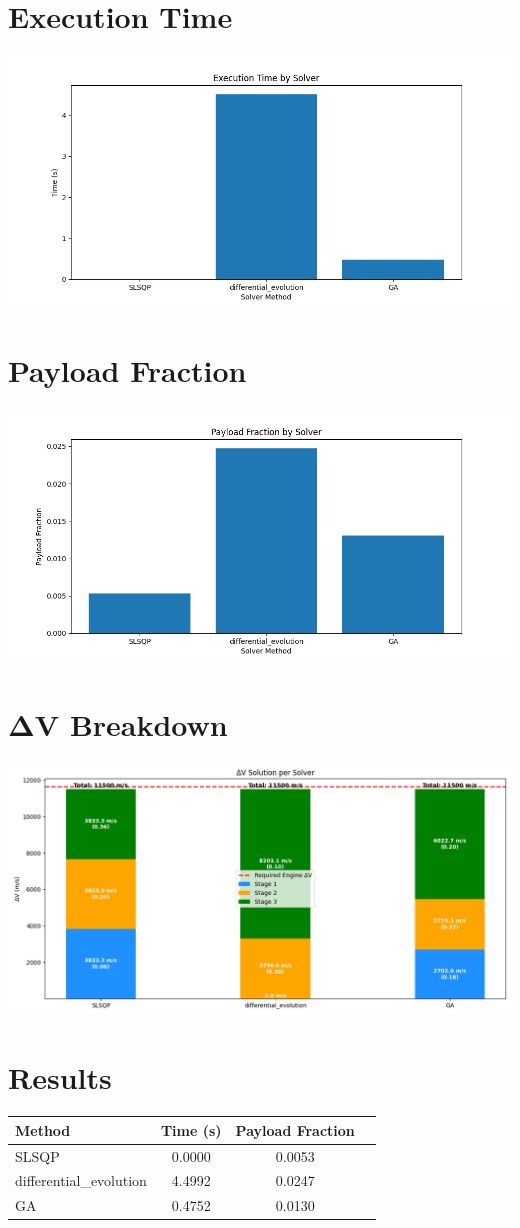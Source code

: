 \documentclass{article}
\begin{document}
\section{Execution Time}
\includegraphics[width=\textwidth]{execution_time.png}

\section{Payload Fraction}
\includegraphics[width=\textwidth]{payload_fraction.png}
                
\section{ΔV Breakdown}
\includegraphics[width=\textwidth]{dv_breakdown.png}

\section{Results}
\begin{tabular}{lccc}
\hline
Method & Time (s) & Payload Fraction \\
\hline
SLSQP & 0.0000 & 0.0053 \\
differential_evolution & 4.4992 & 0.0247 \\
GA & 0.4752 & 0.0130 \\
\hline
\end{tabular}
\end{document}
